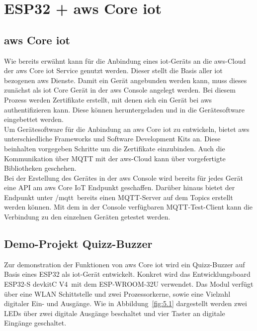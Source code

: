 \chapter{ESP32 + \acrshort{aws} Core \acrshort{iot}}\label{ch:5}
\section{\acrshort{aws} Core \acrshort{iot}}\label{sec:5.1}
Wie bereits erwähnt kann für die Anbindung eines \acrshort{iot}-Geräts an die \acrshort{aws}-\Gls{Cloud} der \acrshort{aws} Core \acrshort{iot} Service genutzt werden. Dieser stellt die Basis aller \acrshort{iot} bezogenen \acrshort{aws} Dienste. Damit ein Gerät angebunden werden kann, muss dieses zunächst als \acrshort{iot} Core Gerät in der \acrshort{aws} Console angelegt werden. Bei diesem Prozess werden Zertifikate erstellt, mit denen sich ein Gerät bei \acrshort{aws} authentifizieren kann. Diese können heruntergeladen und in die Gerätesoftware eingebettet werden\cite*[]{AWSIoT}.\\ Um Gerätesoftware für die Anbindung an \acrshort{aws} Core \acrshort{iot} zu entwickeln, bietet \acrshort{aws} unterschiedliche Frameworks und Software Development Kits an. Diese beinhalten vorgegeben Schritte um die Zertifikate einzubinden. Auch die Kommunikation über MQTT mit der \acrshort{aws}-\Gls{Cloud} kann über vorgefertigte Bibliotheken geschehen\cite*[]{AWSSDK}.\\ Bei der Erstellung des Gerätes in der \acrshort{aws} Console wird bereits für jedes Gerät eine API am \acrshort{aws} Core IoT Endpunkt geschaffen. Darüber hinaus bietet der Endpunkt unter \glqq{}/mqtt\grqq\ bereits einen MQTT-Server auf dem \Gls{Topics} erstellt werden können. Mit dem in der Console verfügbaren MQTT-Test-Client kann die Verbindung zu den einzelnen Geräten getestet werden.
\section{Demo-Projekt Quizz-Buzzer}\label{sec:5.2}
Zur demonstration der Funktionen von \acrshort{aws} Core \acrshort{iot} wird ein Quizz-Buzzer auf Basis eines ESP32 als \acrshort{iot}-Gerät entwickelt. Konkret wird das Entwicklungsboard \glqq{}ESP32-S devkitC V4\grqq\ mit dem ESP-WROOM-32U verwendet. Das Modul verfügt über eine WLAN Schittstelle und zwei Prozessorkerne, sowie eine Vielzahl digitaler Ein- und Ausgänge. Wie in Abbildung~\ref*{fig:5.1} dargestellt werden zwei LEDs über zwei digitale Ausgänge beschaltet und vier Taster an digitale Eingänge geschaltet. 
\FloatBarrier